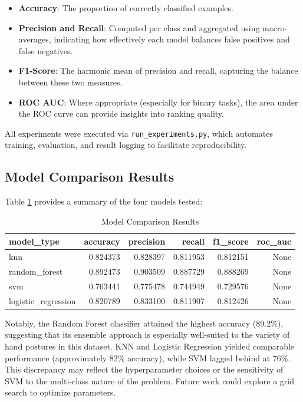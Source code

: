 \documentclass{article}
\begin{document}
\begin{itemize}
    \item \textbf{Accuracy}: The proportion of correctly classified examples.
    \item \textbf{Precision and Recall}: Computed per class and aggregated using macro-averages, indicating how effectively each model balances false positives and false negatives.
    \item \textbf{F1-Score}: The harmonic mean of precision and recall, capturing the balance between these two measures.
    \item \textbf{ROC AUC}: Where appropriate (especially for binary tasks), the area under the ROC curve can provide insights into ranking quality.
\end{itemize}

All experiments were executed via \texttt{run\_experiments.py}, which automates training, evaluation, and result logging to facilitate reproducibility.

\subsection{Model Comparison Results}
Table \ref{tab:model-comparison} provides a summary of the four models tested:

\begin{table}[ht]
\centering
\caption{Model Comparison Results}
\label{tab:model-comparison}
\begin{tabular}{lrrrrr}
\toprule
\textbf{model\_type} & \textbf{accuracy} & \textbf{precision} & \textbf{recall} & \textbf{f1\_score} & \textbf{roc\_auc}\\
\midrule
knn                   & 0.824373 & 0.828397 & 0.811953 & 0.812151 & None \\
random\_forest        & 0.892473 & 0.903509 & 0.887729 & 0.888269 & None \\
svm                   & 0.763441 & 0.775478 & 0.744949 & 0.729576 & None \\
logistic\_regression  & 0.820789 & 0.833100 & 0.811907 & 0.812426 & None \\
\bottomrule
\end{tabular}
\end{table}


Notably, the Random Forest classifier attained the highest accuracy (89.2\%), suggesting that its ensemble approach is especially well-suited to the variety of hand postures in this dataset. KNN and Logistic Regression yielded comparable performance (approximately 82\% accuracy), while SVM lagged behind at 76\%. This discrepancy may reflect the hyperparameter choices or the sensitivity of SVM to the multi-class nature of the problem. Future work could explore a grid search to optimize parameters.
\end{document}
